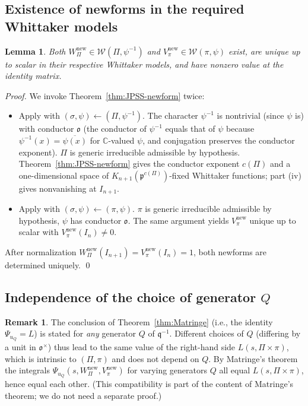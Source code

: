 \documentclass[12pt]{article}
\newtheorem{lemma}[theorem]{Lemma}
\theoremstyle{definition}
\newtheorem{remark}[theorem]{Remark}
\begin{document}
\subsection{Existence of newforms in the required Whittaker models}

\begin{lemma}\label{lem:newform-exists}
Both $W_\Pi^{\mathrm{new}}\in\mathcal{W}(\Pi,\psi^{-1})$ and $V_\pi^{\mathrm{new}}\in\mathcal{W}(\pi,\psi)$ exist, are unique up to scalar in their respective Whittaker models, and have nonzero value at the identity matrix.
\end{lemma}

\begin{proof}
We invoke Theorem~\ref{thm:JPSS-newform} twice:
\begin{itemize}
\item Apply with $(\sigma,\psi)\leftarrow(\Pi,\psi^{-1})$. The character $\psi^{-1}$ is nontrivial (since $\psi$ is) with conductor $\mathfrak{o}$ (the conductor of $\psi^{-1}$ equals that of $\psi$ because $\psi^{-1}(x)=\overline{\psi(x)}$ for $\mathbb{C}$-valued $\psi$, and conjugation preserves the conductor exponent). $\Pi$ is generic irreducible admissible by hypothesis. Theorem~\ref{thm:JPSS-newform} gives the conductor exponent $c(\Pi)$ and a one-dimensional space of $K_{n+1}(\mathfrak{p}^{c(\Pi)})$-fixed Whittaker functions; part (iv) gives nonvanishing at $I_{n+1}$.
\item Apply with $(\sigma,\psi)\leftarrow(\pi,\psi)$. $\pi$ is generic irreducible admissible by hypothesis, $\psi$ has conductor $\mathfrak{o}$. The same argument yields $V_\pi^{\mathrm{new}}$ unique up to scalar with $V_\pi^{\mathrm{new}}(I_n)\ne 0$.
\end{itemize}
After normalization $W_\Pi^{\mathrm{new}}(I_{n+1})=V_\pi^{\mathrm{new}}(I_n)=1$, both newforms are determined uniquely. \qed
\end{proof}

\subsection{Independence of the choice of generator $Q$}

\begin{remark}\label{rem:uQ-Q-class}
The conclusion of Theorem~\ref{thm:Matringe} (i.e., the identity $\Psi_{u_Q}=L$) is stated for \emph{any} generator $Q$ of $\mathfrak{q}^{-1}$. Different choices of $Q$ (differing by a unit in $\mathfrak{o}^\times$) thus lead to the same value of the right-hand side $L(s,\Pi\times\pi)$, which is intrinsic to $(\Pi,\pi)$ and does not depend on $Q$. By Matringe's theorem the integrals $\Psi_{u_Q}(s,W_\Pi^{\mathrm{new}},V_\pi^{\mathrm{new}})$ for varying generators $Q$ all equal $L(s,\Pi\times\pi)$, hence equal each other. (This compatibility is part of the content of Matringe's theorem; we do not need a separate proof.)
\end{remark}
\end{document}
